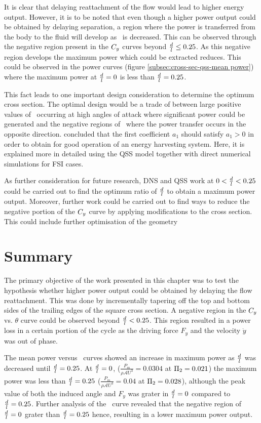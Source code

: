 It is clear that delaying reattachment of the flow would lead to higher energy output. However, it is to be noted that even though a higher power output could be obtained by delaying separation, a region where the power is transferred from the body to the fluid will develop as \ratio\ is decreased. This can be observed through the negative region present in the $C_{y}$ curves beyond $\frac{d}{l}\leq0.25$. As this negative region develops the maximum power which could be extracted reduces. This could be observed in the power curves (figure \ref{subsec:cross-sec-qss-mean power}) where the maximum power at $\frac{d}{l}=0$ is less than $\frac{d}{l}=0.25$.

This fact leads to one important design consideration to determine the optimum cross section. The optimal design would be a trade of between large positive values of \cy\ occurring at high angles of attack where significant power could be generated and the negative regions of \cy\ where the power transfer occurs in the opposite direction. \citet{Barrero-Gil2010a} concluded that the first coefficient $a_1$ should satisfy  $a_1>0$ in order to obtain for good operation of an energy harvesting system. Here, it is explained more in detailed using the QSS model together with direct numerical simulations for FSI cases. 

As further consideration for future research, DNS and QSS work at $0<\frac{d}{l}<0.25$ could be carried out to find the optimum ratio of $\frac{d}{l}$ to obtain a maximum power output. Moreover, further work could be carried out to find ways to reduce the negative portion of the $C_{y}$ curve by applying modifications to the cross section. This could include further optimisation of the geometry 

\section{Summary} 
\label{sec:summary-diff-cross-sec}

The primary objective of the work presented in this chapter was to test the hypothesis whether higher power output could be obtained by delaying the flow reattachment. This was done by incrementally tapering off the top and bottom sides of the trailing edges of the square cross section. A negative region in the $C_{y}$ vs. $\theta$ curve could be observed beyond $\frac{d}{l}<0.25$. This region resulted in a power loss in a certain portion of the cycle as the driving force $F_y$ and the velocity $\dot{y}$ was out of phase.

The mean power versus \massdamp\ curves showed an increase in maximum power as $\frac{d}{l}$ was decreased until $\frac{d}{l}=0.25$. At $\frac{d}{l}=0$,  ($\displaystyle\frac{P_{m}}{\rho \mathcal{A}U^3}=0.0304$ at $\Pi_2=0.021$) the maximum power was less than $\frac{d}{l}=0.25$ ($\displaystyle\frac{P_{m}}{\rho \mathcal{A}U^3}=0.04$ at $\Pi_2=0.028$), although the peak value of both the induced angle and $F_{y}$ was grater in $\frac{d}{l}=0$ compared to $\frac{d}{l}=0.25$. Further analysis of the \cy\ curve revealed that the negative region of $\frac{d}{l}=0$  grater than $\frac{d}{l}=0.25$ hence, resulting in a lower maximum power output. 

